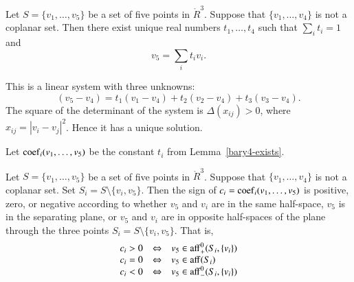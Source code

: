 \begin{tarskidata}
\begin{tarski}

\begin{lemma}
Let $S=\{v_1,\ldots,v_5\}$ be
a set of five points in $\ring{R}^3$.  Suppose
that $\{v_1,\ldots,v_4\}$ is not a coplanar
set.    Then there exist unique real numbers
$t_1,\ldots,t_4$ such that $\sum_i t_i = 1$ and
	$$v_5 = \sum_i t_i v_i.$$
\end{lemma}

\begin{proved}  This is a linear system with
three unknowns:
	$$(v_5- v_4) = t_1 (v_1-v_4) +
		t_2 (v_2-v_4) + t_3 (v_3-v_4).
	$$
The
square of the
determinant of the system is
$\Delta(x_{ij}) >0$, where $x_{ij}=|v_i-v_j|^2$.
Hence it has a unique solution.
\swallowed\end{proved}
\end{tarski}



\begin{tarski}

\begin{definition}[coef]
Let ${\operatorname{coef}}_i(v_1,\ldots,v_5)$
be the constant $t_i$ from Lemma~\ref{bary4-exists}.
\end{definition}
\end{tarski}




\begin{tarski}

\begin{lemma}
Let $S=\{v_1,\ldots,v_5\}$ be
a set of five points in $\ring{R}^3$.  Suppose
that $\{v_1,\ldots,v_4\}$ is not a coplanar
set.  Set $S_i=S\setminus \{v_i,v_5\}$. Then the sign of 
$c_i={\operatorname{coef}}_i(v_1,\ldots,v_5)$ is positive,
zero, or negative according to whether $v_5$
and $v_i$ are in the same half-space, $v_5$
is in the separating plane, or $v_5$ and $v_i$
are in opposite half-spaces of the plane
through the three points $S_i=S\setminus\{v_i,v_5\}$.
That is,
  $$
  \begin{array}{lll}
   c_i > 0 &\Leftrightarrow   &v_5\in{\operatorname{aff}}_+^0(S_i,\{v_i\})\\
   c_i = 0 &\Leftrightarrow   &v_5\in{\operatorname{aff}}(S_i)\\
   c_i < 0 &\Leftrightarrow   &v_5\in{\operatorname{aff}}_-^0(S_i,\{v_i\})\\
    \end{array}
  $$
\end{lemma}


\end{tarski}
\end{tarskidata}
